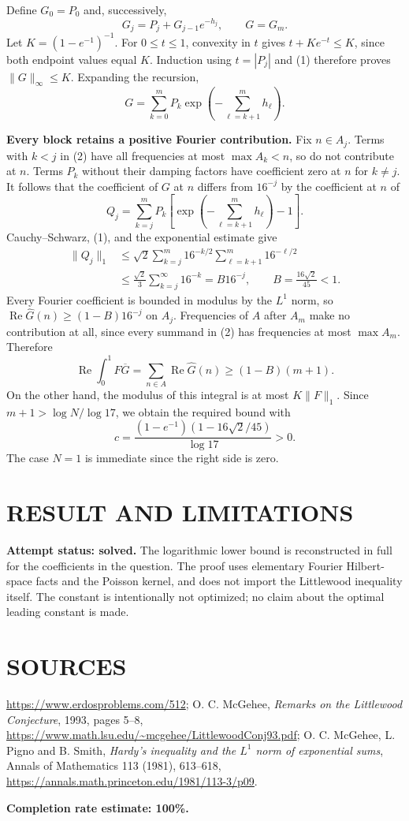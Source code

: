 Define $G_0=P_0$ and, successively,
\[
 G_j=P_j+G_{j-1}e^{-h_j},\qquad G=G_m.
\]
Let $K=(1-e^{-1})^{-1}$. For $0\leq t\leq1$, convexity in $t$ gives $t+Ke^{-t}\leq K$, since both endpoint values equal $K$. Induction using $t=|P_j|$ and (1) therefore proves $\|G\|_\infty\leq K$. Expanding the recursion,
\[
 G=\sum_{k=0}^m P_k\exp\left(-\sum_{\ell=k+1}^m h_\ell\right). \tag{2}
\]

\textbf{Every block retains a positive Fourier contribution.} Fix $n\in A_j$. Terms with $k<j$ in (2) have all frequencies at most $\max A_k<n$, so do not contribute at $n$. Terms $P_k$ without their damping factors have coefficient zero at $n$ for $k\ne j$. It follows that the coefficient of $G$ at $n$ differs from $16^{-j}$ by the coefficient at $n$ of
\[
 Q_j=\sum_{k=j}^mP_k\left[\exp\left(-\sum_{\ell=k+1}^m h_\ell\right)-1\right].
\]
Cauchy--Schwarz, (1), and the exponential estimate give
\[
 \begin{split}
 \|Q_j\|_1
 &\leq\sqrt2\sum_{k=j}^m16^{-k/2}
                   \sum_{\ell=k+1}^m16^{-\ell/2}\\
 &\leq\frac{\sqrt2}{3}\sum_{k=j}^\infty16^{-k}
 =B16^{-j},\qquad B=\frac{16\sqrt2}{45}<1.
 \end{split}                                                   \tag{3}
\]
Every Fourier coefficient is bounded in modulus by the $L^1$ norm, so
$\operatorname{Re}\widehat G(n)\geq(1-B)16^{-j}$ on $A_j$. Frequencies of $A$ after $A_m$ make no contribution at all, since every summand in (2) has frequencies at most $\max A_m$. Therefore
\[
 \operatorname{Re}\int_0^1 F\overline G
 =\sum_{n\in A}\operatorname{Re}\widehat G(n)
 \geq(1-B)(m+1).
\]
On the other hand, the modulus of this integral is at most $K\|F\|_1$. Since $m+1>\log N/\log17$, we obtain the required bound with
\[
 c=\frac{(1-e^{-1})(1-16\sqrt2/45)}{\log17}>0.
\]
The case $N=1$ is immediate since the right side is zero.

\section{RESULT AND LIMITATIONS}
\textbf{Attempt status: solved.} The logarithmic lower bound is reconstructed in full for the coefficients in the question. The proof uses elementary Fourier Hilbert-space facts and the Poisson kernel, and does not import the Littlewood inequality itself. The constant is intentionally not optimized; no claim about the optimal leading constant is made.

\section{SOURCES}
\url{https://www.erdosproblems.com/512}; O. C. McGehee, \emph{Remarks on the Littlewood Conjecture}, 1993, pages 5--8, \url{https://www.math.lsu.edu/~mcgehee/LittlewoodConj93.pdf}; O. C. McGehee, L. Pigno and B. Smith, \emph{Hardy's inequality and the $L^1$ norm of exponential sums}, Annals of Mathematics 113 (1981), 613--618, \url{https://annals.math.princeton.edu/1981/113-3/p09}.

\textbf{Completion rate estimate: 100\%.}
